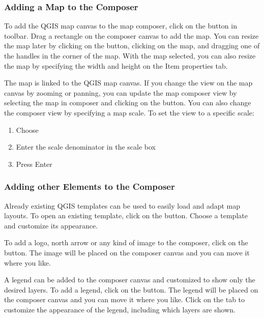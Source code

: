 \subsubsection{Adding a Map to the Composer}

To add the QGIS map canvas to the map composer, click on the
button in toolbar. Drag a rectangle on the composer canvas to add the
map. You can resize the map later by clicking on the 
button, clicking on the map, and dragging one of the handles in the corner of
the map. With the map selected, you can also resize the map by specifying the
width and height on the Item properties tab.

The map is linked to the QGIS map canvas. If you change the view on the map
canvas by zooming or panning, you can update the map composer view by
selecting the map in composer and clicking on the  button.
You can also change the composer view by specifying a map scale. To set the
view to a specific scale:

\begin{enumerate}
\item Choose 
\item Enter the scale denominator in the scale box
\item Press Enter
\end{enumerate} 

\subsubsection{Adding other Elements to the Composer} 
 
Already existing QGIS templates can be used to easily load and adapt map
layouts. To open an existing template, click on the
button. Choose a template and
customize its appearance. 

To add a logo, north arrow or any  kind of image to the composer, click on
the 
button. The image will 
be placed on the composer canvas and you can move it where you like. 

A legend can be added to the composer canvas and customized to show only the
desired layers. To add a legend, click on the
button. The legend will be
placed on the composer canvas and you can move it where you like. Click on
the  tab to customize the appearance of the legend, including
which layers are shown.

